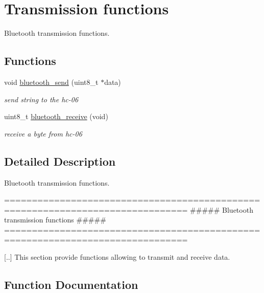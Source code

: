 \hypertarget{group___transmission}{}\section{Transmission functions}
\label{group___transmission}


Bluetooth transmission functions.  


\subsection*{Functions}
\begin{DoxyCompactItemize}
\item 
void \hyperlink{group___transmission_ga31d829d5658369ee2c90b9c3cdbedfe1}{bluetooth\+\_\+send} (uint8\+\_\+t $\ast$data)
\begin{DoxyCompactList}\small\item\em send string to the hc-\/06 \end{DoxyCompactList}\item 
uint8\+\_\+t \hyperlink{group___transmission_gab7ad1e1b94cf1cedc8a8e5151b0e25cb}{bluetooth\+\_\+receive} (void)
\begin{DoxyCompactList}\small\item\em receive a byte from hc-\/06 \end{DoxyCompactList}\end{DoxyCompactItemize}


\subsection{Detailed Description}
Bluetooth transmission functions. 

\begin{DoxyVerb} ===============================================================================
         ##### Bluetooth transmission functions #####
 ===============================================================================

 [..] This section provide functions allowing to transmit and receive data.\end{DoxyVerb}
 

\subsection{Function Documentation}
\mbox{\label{group___transmission_gab7ad1e1b94cf1cedc8a8e5151b0e25cb}} 
